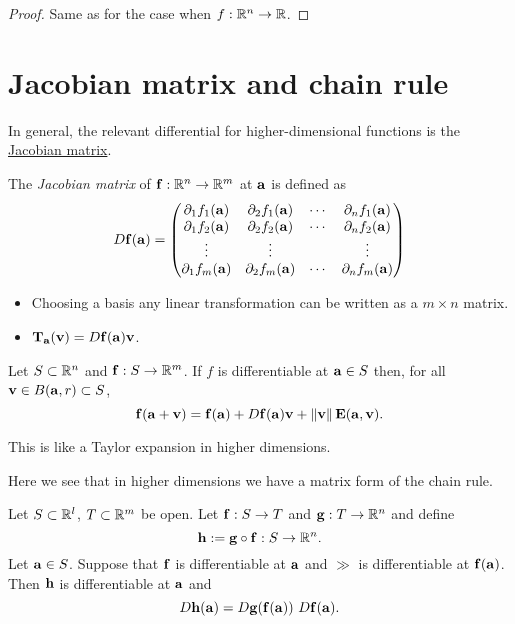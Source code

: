 \begin{proof}
    Same as for the case when \(f:\bR^n \to \bR\).
\end{proof}


\section{Jacobian matrix and chain rule}

In general, the relevant differential for higher-dimensional functions is the \href{https://en.wikipedia.org/wiki/Jacobian_matrix_and_determinant}{Jacobian matrix}.

\begin{definition}
    The \emph{Jacobian matrix} of \(\ff : \bR^n \to \bR^m\) at \(\aa\) is defined as
    \[
        D\ff(\aa) =
        \begin{pmatrix}
            \partial_1 f_1 (\aa) & \partial_2 f_1 (\aa) & \cdots & \partial_n f_1 (\aa) \\
            \partial_1 f_2 (\aa) & \partial_2 f_2 (\aa) & \cdots & \partial_n f_2 (\aa) \\
            \vdots               & \vdots               &        & \vdots               \\
            \partial_1 f_m (\aa) & \partial_2 f_m (\aa) & \cdots & \partial_n f_m (\aa)
        \end{pmatrix}
    \]

\end{definition}




\begin{itemize}
    \item Choosing a basis any linear transformation can be written as a \(m \times n\) matrix.
    \item \( \mathbf{T}_\aa  (\vv ) = D\ff(\aa) \vv\).
\end{itemize}

Let \(S\subset \bR^n\) and \(\ff : S \to \bR^m\).
If \(f\) is differentiable at \(\aa \in S\) then, for all  \(\vv\in B(\aa,r) \subset S\),
\[
    \ff(\aa+\vv) = \ff(\aa) +  D\ff(\aa) \vv + \norm{\vv}\mathbf{E}(\aa,\vv).
\]


This is like a Taylor expansion in higher dimensions.


Here we see that in higher dimensions we have a matrix form of the chain rule.

\begin{theorem}
    \label{thm:jacobian-chain}
    Let \(S\subset \bR^l\), \(T\subset \bR^m\) be open.
    Let \(\ff: S \to T\) and \(\gg:T \to \bR^n\) and define
    \[
        \hh := \gg \circ \ff : S \to \bR^n.
    \]
    Let  \(\aa\in S\). Suppose that \(\ff\) is differentiable at \(\aa\) and \(\gg\) is differentiable at \(\ff(\aa)\).
    Then \(\hh\) is differentiable at \(\aa\) and
    \[
        D\hh(\aa) = D\gg(\ff(\aa)) \ D\ff(\aa).
    \]
\end{theorem}

